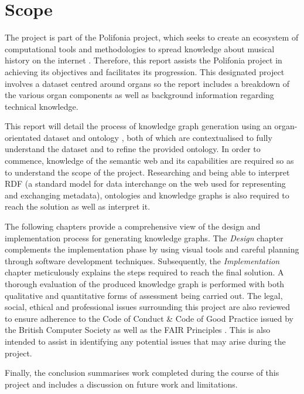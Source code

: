\section{Scope}
\hspace{0.5cm} The project is part of the Polifonia project, which seeks to create an ecosystem of computational tools and methodologies to spread knowledge about musical history on the internet \cite{polifoniaproject}. Therefore, this report assists the Polifonia project in achieving its objectives and facilitates its progression. This designated project involves a dataset centred around organs so the report includes a breakdown of the various organ components as well as background information regarding technical knowledge. 

This report will detail the process of knowledge graph generation using an organ-orientated dataset and ontology \cite{organontology}, both of which are contextualised to fully understand the dataset and to refine the provided ontology. In order to commence, knowledge of the semantic web and its capabilities are required so as to understand the scope of the project. Researching and being able to interpret RDF (a standard model for data interchange on the web \cite{gottschalk2021creation} used for representing and exchanging metadata), ontologies and knowledge graphs is also required to reach the solution as well as interpret it. 

The following chapters provide a comprehensive view of the design and implementation process for generating knowledge graphs. The \textit{Design} chapter complements the implementation phase by using visual tools and careful planning through software development techniques. Subsequently, the \textit{Implementation} chapter meticulously explains the steps required to reach the final solution. A thorough evaluation of the produced knowledge graph is performed with both qualitative and quantitative forms of assessment being carried out. The legal, social, ethical and professional issues surrounding this project are also reviewed to ensure adherence to the Code of Conduct \& Code of Good Practice issued by the British Computer Society \cite{bcs} as well as the FAIR Principles \cite{fairprinciples}. This is also intended to assist in identifying any potential issues that may arise during the project.

Finally, the conclusion summarises work completed during the course of this project and includes a discussion on future work and limitations. 
